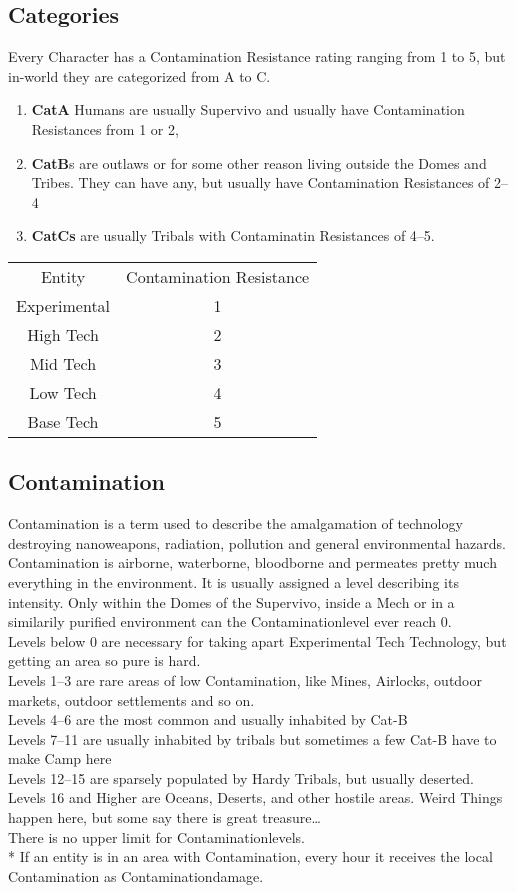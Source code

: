 \subsection{Categories}\label{subsec:categories}
Every Character has a Contamination Resistance rating ranging from 1 to 5,
but in-world they are categorized from A to C\@.
\begin{enumerate}[label = - ]
\item \textbf{CatA} Humans are usually Supervivo and usually have Contamination Resistances from 1 or 2,
\item \textbf{CatB}s are outlaws or for some other reason living outside the Domes and Tribes. They can have any,
 but usually have Contamination Resistances of 2--4
\item \textbf{CatCs} are usually Tribals with Contaminatin Resistances of 4--5.
\end{enumerate}
\begin{tabular}{c|c}
    Entity & Contamination  Resistance \\
    Experimental & 1 \\
    High Tech & 2 \\
    Mid Tech & 3 \\
    Low Tech & 4  \\
    Base Tech & 5 \\
\end{tabular}


\subsection{Contamination}\label{subsec:contamination}
Contamination is a term used to describe the amalgamation of technology destroying nanoweapons, radiation, pollution
and general environmental hazards.
Contamination is airborne, waterborne, bloodborne and permeates pretty much everything in the environment.
It is usually assigned a level describing its intensity.
Only within the Domes
of the Supervivo, inside a Mech or in a similarily purified environment can the Contaminationlevel ever reach 0. \\
Levels below 0 are necessary for taking apart Experimental Tech Technology, but getting an area so pure is hard.\\
Levels 1--3
are rare areas of low Contamination, like Mines, Airlocks, outdoor markets, outdoor settlements and so on. \\
Levels 4--6
are the most common and usually inhabited by Cat-B\\
Levels 7--11
are usually inhabited by tribals but sometimes a few Cat-B have to make Camp here \\
Levels 12--15
are sparsely populated by Hardy Tribals, but usually deserted.\\
Levels 16 and Higher
are Oceans, Deserts, and other hostile areas.
Weird Things happen here, but some say there is great treasure\ldots\\
There is no upper limit for Contaminationlevels. \\*
If an entity is in an area with Contamination, every hour it receives the local Contamination
as Contaminationdamage.\par
